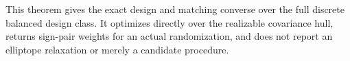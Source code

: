 This theorem gives the exact design and matching converse over the full discrete balanced design class. It optimizes directly over the realizable covariance hull, returns sign-pair weights for an actual randomization, and does not report an elliptope relaxation or merely a candidate procedure.